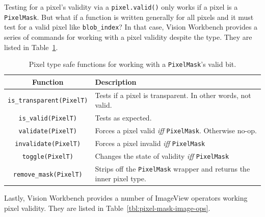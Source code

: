 Testing for a pixel's validity via a \verb#pixel.valid()# only works
if a pixel is a \verb#PixelMask#. But what if a function is written
generally for all pixels and it must test for a valid pixel like
\verb#blob_index#? In that case, Vision Workbench provides a series of
commands for working with a pixel validity despite the type. They are
listed in Table~\ref{tbl:pixel-mask-functions}.

\begin{table}[htb]\begin{centering}
\begin{tabular}{|c|l|} \hline
Function & Description \\ \hline \hline
\verb#is_transparent(PixelT)# & Tests if a pixel is transparent. In other words, not valid. \\ \hline
\verb#is_valid(PixelT)# & Tests as expected. \\ \hline
\verb#validate(PixelT)# & Forces a pixel valid \emph{iff} \verb#PixelMask#. Otherwise no-op. \\ \hline
\verb#invalidate(PixelT)# & Forces a pixel invalid \emph{iff} \verb#PixelMask# \\ \hline
\verb#toggle(PixelT)# & Changes the state of validity \emph{iff} \verb#PixelMask# \\ \hline
\verb#remove_mask(PixelT)# & Strips off the \verb#PixelMask# wrapper and returns the inner pixel type. \\ \hline
\end{tabular}
\caption{Pixel type safe functions for working with a {\tt PixelMask}'s valid bit.}
\label{tbl:pixel-mask-functions}
\end{centering}
\end{table}

Lastly, Vision Workbench provides a number of ImageView operators
working pixel validity. They are listed in
Table~\ref{tbl:pixel-mask-image-ops}.

